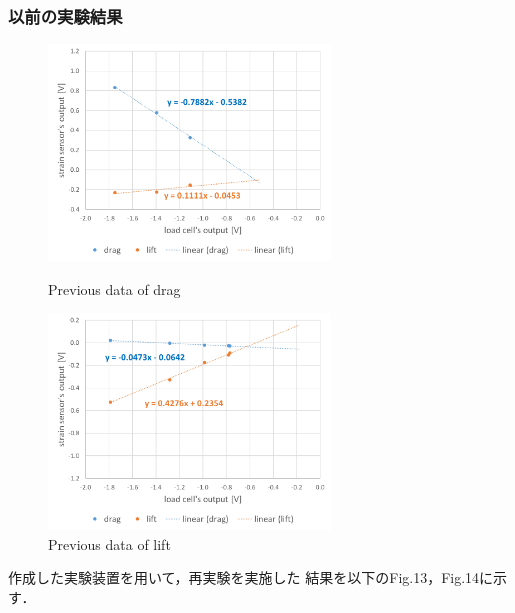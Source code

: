 \documentclass[twocolumn,a4j]{jsarticle}
\begin{document}
\subsubsection*{以前の実験結果}
\begin{figure}[htbp]
    \footnotesize
    \begin{center}
        \includegraphics[width=75mm]{../images/graph_21119_drag_previous.png}
        \caption{Previous data of drag}
        \includegraphics[width=75mm]{../images/graph_21119_lift_previous.png}
        \caption{Previous data of lift}
    \end{center}
\end{figure}

\newpage
作成した実験装置を用いて，再実験を実施した
結果を以下のFig.13，Fig.14に示す．\\
\end{document}
